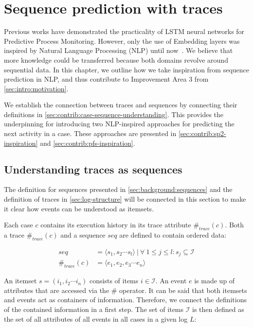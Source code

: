 \chapter{Sequence prediction with traces}
\label{chap:taking-inspiration}
Previous works have demonstrated the practicality of LSTM neural networks for Predictive Process Monitoring. However, only the use of Embedding layers was inspired by Natural Language Processing (NLP) until now~\cite{evermann2016}. We believe that more knowledge could be transferred because both domains revolve around sequential data. In this chapter, we outline how we take inspiration from sequence prediction in NLP, and thus contribute to Improvement Area 3 from \autoref{sec:intro:motivation}.

We establish the connection between traces and sequences by connecting their definitions in \autoref{sec:contrib:case-sequence-understanding}. This provides the underpinning for introducing two NLP-inspired approaches for predicting the next activity in a case. These approaches are presented in \autoref{sec:contrib:sp2-inspiration} and \autoref{sec:contrib:pfs-inspiration}.

\section{Understanding traces as sequences}\label{sec:contrib:case-sequence-understanding}
The definition for sequences presented in \autoref{sec:background:sequences} and the definition of traces in \autoref{sec:log-structure} will be connected in this section to make it clear how events can be understood as itemsets.

Each case $c$ contains its execution history in its trace attribute $\#_{trace}(c)$.
Both a trace $\#_{trace}(c)$ and a sequence $seq$ are defined to contain ordered data:

\begin{equation*}
\begin{split}
seq           &=  \langle s_1,s_2\cdots s_l \rangle\ |\ \forall\ 1 \leq j \leq l: s_j \subseteq \mathscr{I}\\
\#_{trace}(c) &= \langle e_1, e_2, e_3\cdots e_n \rangle
\end{split}
\end{equation*}

An itemset $s = (i_1, i_2 \cdots i_n)$ consists of items $i \in \mathscr{I}$.
An event $e$ is made up of attributes that are accessed via the $\#$ operator.
It can be said that both itemsets and events act as containers of information.
Therefore, we connect the definitions of the contained information in a first step.
The set of items $\mathscr{I}$ is then defined as the set of all attributes of all events in all cases in a given log $L$:

